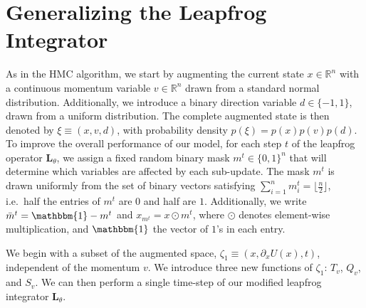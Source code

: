 \section{Generalizing the Leapfrog Integrator}%
\label{sec:generalizing_lf}
As in the HMC algorithm, we start by augmenting the current state $x \in
\mathbb{R}^n$ with a continuous momentum variable $v \in \mathbb{R}^{n}$ drawn
from a standard normal distribution.
%
Additionally, we introduce a binary direction variable $d \in \{ -1, 1\}$,
drawn from a uniform distribution. 
%
The complete augmented state is then denoted by $\xi \equiv (x, v, d)$, with
probability density $p(\xi) = p(x) p(v) p(d)$.
%
To improve the overall performance of our model, for each step $t$ of the
leapfrog operator $\mathbf{L}_{\theta}$, we assign a fixed random binary mask
$m^{t} \in{\{0, 1\}}^n$ that will determine which variables are affected by
each sub-update.
%
The mask $m^t$ is drawn uniformly from the set of binary vectors satisfying
$\sum_{i=1}^{n} m_{i}^{t} = \lfloor \frac{n}{2}\rfloor$, i.e.\ half the entries
of $m^t$ are $0$ and half are $1$.
%
Additionally, we write $\bar m^{t} = \mathbbm{1} - m^{t}$ and $x_{m^t} = x
\odot m^{t}$, where $\odot$ denotes element-wise multiplication, and
$\mathbbm{1}$ the vector of $1$'s in each entry.
%

We begin with a subset of the augmented space, $\zeta_1 \equiv (x, \partial_{x}
U(x), t)$, independent of the momentum $v$.
%
We introduce three new functions of $\zeta_1$: $T_v$, $Q_v$, and $S_v$.
%
We can then perform a single time-step of our modified leapfrog integrator
$\mathbf{L}_{\theta}$.
%

